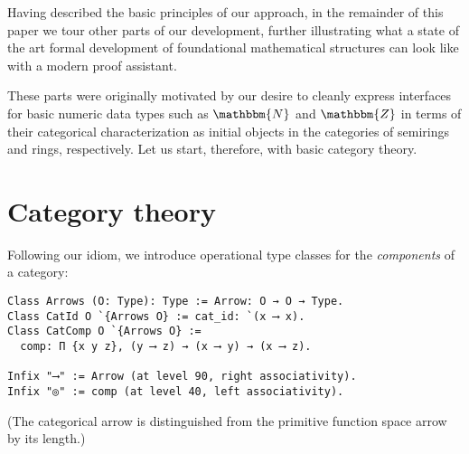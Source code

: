 \documentclass[a4paper,10pt,runningheads]{llncs}
\newcommand{\N}{\ensuremath{\mathbbm{N}}}
\newcommand{\Z}{\ensuremath{\mathbbm{Z}}}
\begin{document}
% 
% 

Having described the basic principles of our approach, in the remainder of this paper we tour other parts of our development, further illustrating what a state of the art formal development of foundational mathematical structures can look like with a modern proof assistant.

These parts were originally motivated by our desire to cleanly express interfaces for basic numeric data types such as $\N$ and $\Z$ in terms of their categorical characterization as initial objects in the categories of semirings and rings, respectively. Let us start, therefore, with basic category theory.

\section{Category theory}\label{cat}

Following our idiom, we introduce operational type classes for the \emph{components} of a category:
\begin{lstlisting}
Class Arrows (O: Type): Type := Arrow: O → O → Type.
Class CatId O `{Arrows O} := cat_id: `(x ⟶ x).
Class CatComp O `{Arrows O} :=
  comp: Π {x y z}, (y ⟶ z) → (x ⟶ y) → (x ⟶ z).

Infix "⟶" := Arrow (at level 90, right associativity).
Infix "◎" := comp (at level 40, left associativity).
\end{lstlisting}
(The categorical arrow is distinguished from the primitive function space arrow by its length.)
\end{document}
